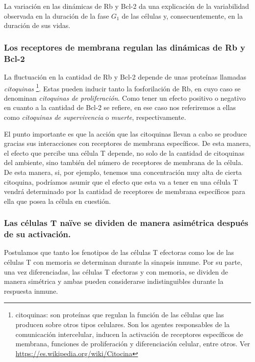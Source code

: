 La variación en las dinámicas de Rb y Bcl-2 da una explicación de la variabilidad observada en la duración de la fase $G_{1}$ de las células y, consecuentemente, en la duración de sus vidas.

\subsubsection{Los receptores de membrana regulan las dinámicas de Rb y Bcl-2}

La fluctuación en la cantidad de Rb y Bcl-2 depende de unas proteínas llamadas \textit{citoquinas} \footnote{citoquinas: son proteínas que regulan la función de las células que las producen sobre otros tipos celulares. Son los agentes responsables de la comunicación intercelular, inducen la activación de receptores específicos de membrana, funciones de proliferación y diferenciación celular, entre otros. Ver \url{https://es.wikipedia.org/wiki/Citocina}}. Estas pueden inducir tanto la fosforilación de Rb, en cuyo caso se denominan \textit{citoquinas de proliferación}. Como tener un efecto positivo o negativo en cuanto a la cantidad de Bcl-2 se refiere, en ese caso nos referiremos a ellas como \textit{citoquinas de supervivencia} o \textit{muerte}, respectivamente.

El punto importante es que la acción que las citoquinas llevan a cabo se produce gracias sus interacciones con receptores de membrana específicos. De esta manera, el efecto que percibe una célula T depende, no solo de la cantidad de citoquinas del ambiente, sino también del número de receptores de membrana de la célula. De esta manera, si, por ejemplo, tenemos una concentración muy alta de cierta citoquina, podríamos asumir que el efecto que esta va a tener en una célula T vendrá determinado por la cantidad de receptores de membrana específicos para ella que posea la célula en cuestión.

\subsubsection{Las células T naïve se dividen de manera asimétrica después de su activación.}

Postulamos que tanto los fenotipos de las células T efectoras como los de las células T con memoria se determinan durante la sinapsis inmune. Por su parte, una vez diferenciadas, las células T efectoras y con memoria, se dividen de manera simétrica y ambas pueden considerarse indistinguibles durante la respuesta inmune.


